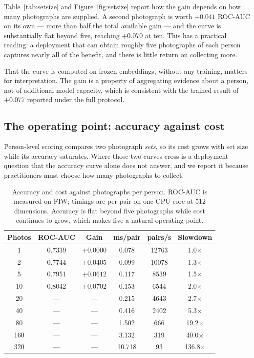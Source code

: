 \documentclass[preprint,12pt]{elsarticle}
\begin{document}
Table~\ref{tab:setsize} and Figure~\ref{fig:setsize} report how the gain
depends on how many photographs are supplied. A second photograph is worth
$+0.041$ ROC-AUC on its own --- more than half the total available gain --- and
the curve is substantially flat beyond five, reaching $+0.070$ at ten. This has
a practical reading: a deployment that can obtain roughly five photographs of
each person captures nearly all of the benefit, and there is little return on
collecting more.

That the curve is computed on frozen embeddings, without any training, matters
for interpretation. The gain is a property of aggregating evidence about a
person, not of additional model capacity, which is consistent with the trained
result of $+0.077$ reported under the full protocol.

\subsection{The operating point: accuracy against cost}
\label{sec:opcost}

Person-level scoring compares two photograph \emph{sets}, so its cost grows
with set size while its accuracy saturates. Where those two curves cross is a
deployment question that the accuracy curve alone does not answer, and we
report it because practitioners must choose how many photographs to collect.

\begin{table}[t]
\centering
\caption{Accuracy and cost against photographs per person. ROC-AUC is measured
on FIW; timings are per pair on one CPU core at $512$ dimensions. Accuracy is
flat beyond five photographs while cost continues to grow, which makes five a
natural operating point.}
\label{tab:opcost}
\small
\begin{tabular}{cccccc}
\toprule
Photos & ROC-AUC & Gain & ms/pair & pairs/s & Slowdown \\
\midrule
1 & 0.7339 & $+0.0000$ & 0.078 & 12763 & 1.0$\times$ \\
2 & 0.7744 & $+0.0405$ & 0.099 & 10078 & 1.3$\times$ \\
5 & 0.7951 & $+0.0612$ & 0.117 & 8539 & 1.5$\times$ \\
10 & 0.8042 & $+0.0702$ & 0.153 & 6544 & 2.0$\times$ \\
20 & --- & --- & 0.215 & 4643 & 2.7$\times$ \\
40 & --- & --- & 0.416 & 2402 & 5.3$\times$ \\
80 & --- & --- & 1.502 & 666 & 19.2$\times$ \\
160 & --- & --- & 3.132 & 319 & 40.0$\times$ \\
320 & --- & --- & 10.718 & 93 & 136.8$\times$ \\
\bottomrule
\end{tabular}
\end{table}
\end{document}
